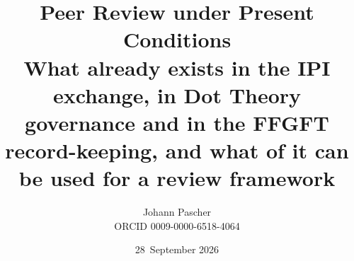 \documentclass[11pt,a4paper]{report}
\title{Peer Review under Present Conditions\\[0.5em]\large What already exists in the IPI exchange, in Dot Theory governance and in the FFGFT record-keeping, and what of it can be used for a review framework}
\date{28~September 2026}
\author{Johann Pascher\\\small ORCID 0009-0000-6518-4064}
\begin{document}
\renewcommand{\thechapter}{}
\renewcommand{\thesection}{\arabic{section}}
\maketitle
\tableofcontents

\end{document}
